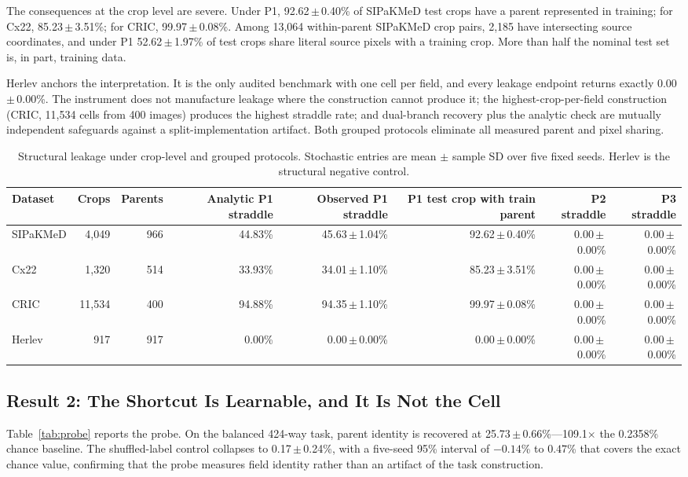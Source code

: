 \documentclass[conference]{IEEEtran}
\newcommand{\meanpm}[2]{#1\,$\pm$\,#2}
\newcommand{\protocol}[1]{\textsf{#1}}
\begin{document}
The consequences at the crop level are severe.
Under \protocol{P1}, \meanpm{92.62}{0.40}\% of SIPaKMeD test crops have a parent represented in training; for Cx22, \meanpm{85.23}{3.51}\%; for CRIC, \meanpm{99.97}{0.08}\%.
Among 13,064 within-parent SIPaKMeD crop pairs, 2,185 have intersecting source coordinates, and under \protocol{P1} \meanpm{52.62}{1.97}\% of test crops share literal source pixels with a training crop.
More than half the nominal test set is, in part, training data.

Herlev anchors the interpretation.
It is the only audited benchmark with one cell per field, and every leakage endpoint returns exactly \meanpm{0.00}{0.00}\%.
The instrument does not manufacture leakage where the construction cannot produce it; the highest-crop-per-field construction (CRIC, 11,534 cells from 400 images) produces the highest straddle rate; and dual-branch recovery plus the analytic check are mutually independent safeguards against a split-implementation artifact.
Both grouped protocols eliminate all measured parent and pixel sharing.

\begin{table}[t]
\caption{Structural leakage under crop-level and grouped protocols. Stochastic entries are mean $\pm$ sample SD over five fixed seeds. Herlev is the structural negative control.}
\label{tab:structural}
\centering
\scriptsize
\setlength{\tabcolsep}{5.2pt}
\begin{tabular}{lrrrrrrr}
\toprule
Dataset & Crops & Parents & Analytic \protocol{P1} straddle & Observed \protocol{P1} straddle & \protocol{P1} test crop with train parent & \protocol{P2} straddle & \protocol{P3} straddle \\
\midrule
SIPaKMeD & 4,049 & 966 & 44.83\% & \meanpm{45.63}{1.04}\% & \meanpm{92.62}{0.40}\% & \meanpm{0.00}{0.00}\% & \meanpm{0.00}{0.00}\% \\
Cx22 & 1,320 & 514 & 33.93\% & \meanpm{34.01}{1.10}\% & \meanpm{85.23}{3.51}\% & \meanpm{0.00}{0.00}\% & \meanpm{0.00}{0.00}\% \\
CRIC & 11,534 & 400 & 94.88\% & \meanpm{94.35}{1.10}\% & \meanpm{99.97}{0.08}\% & \meanpm{0.00}{0.00}\% & \meanpm{0.00}{0.00}\% \\
Herlev & 917 & 917 & 0.00\% & \meanpm{0.00}{0.00}\% & \meanpm{0.00}{0.00}\% & \meanpm{0.00}{0.00}\% & \meanpm{0.00}{0.00}\% \\
\bottomrule
\end{tabular}
\end{table}

\subsection{Result 2: The Shortcut Is Learnable, and It Is Not the Cell}
Table~\ref{tab:probe} reports the probe.
On the balanced 424-way task, parent identity is recovered at \meanpm{25.73}{0.66}\%---109.1$\times$ the 0.2358\% chance baseline.
The shuffled-label control collapses to \meanpm{0.17}{0.24}\%, with a five-seed 95\% interval of $-0.14$\% to $0.47$\% that covers the exact chance value, confirming that the probe measures field identity rather than an artifact of the task construction.
\end{document}
